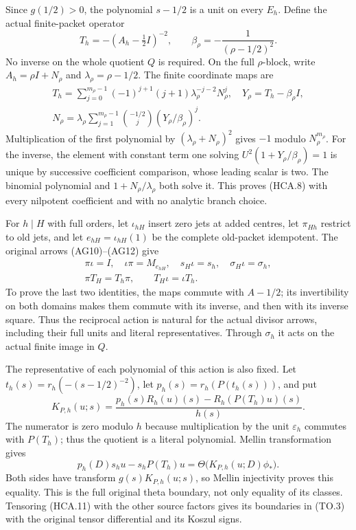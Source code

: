 Since $g(1/2)>0$, the polynomial $s-1/2$ is a unit on every
$E_h$. Define the actual finite-packet operator
\[
 T_h=-(A_h-\tfrac12I)^{-2},\qquad
 \beta_\rho=-\frac1{(\rho-1/2)^2}.
 \tag{HCA.7}
\]
No inverse on the whole quotient $Q$ is required. On the full
$\rho$-block, write $A_h=\rho I+N_\rho$ and
$\lambda_\rho=\rho-1/2$. The finite coordinate maps are
\[
 \begin{gathered}
 T_h=\sum_{j=0}^{m_\rho-1}(-1)^{j+1}(j+1)
                 \lambda_\rho^{-j-2}N_\rho^j,
 \quad Y_\rho=T_h-\beta_\rho I,\\
 N_\rho=\lambda_\rho\sum_{j=1}^{m_\rho-1}
             \binom{-1/2}{j}(Y_\rho/\beta_\rho)^j.
 \end{gathered}
 \tag{HCA.8}
\]
Multiplication of the first polynomial by
$(\lambda_\rho+N_\rho)^2$ gives $-1$ modulo $N_\rho^{m_\rho}$.
For the inverse, the element with constant term one solving
$U^2(1+Y_\rho/\beta_\rho)=1$ is unique by successive coefficient
comparison, whose leading scalar is two. The binomial polynomial
and $1+N_\rho/\lambda_\rho$ both solve it. This proves (HCA.8)
with every nilpotent coefficient and with no analytic branch choice.

For $h\mid H$ with full orders, let $\iota_{hH}$ insert zero
jets at added centres, let $\pi_{Hh}$ restrict to old jets, and
let $e_{hH}=\iota_{hH}(1)$ be the complete old-packet idempotent.
The original arrows (AG10)--(AG12) give
\[
 \begin{gathered}
 \pi\iota=I,\quad\iota\pi=M_{e_{hH}},\quad
 s_H\iota=s_h,\quad\sigma_H\iota=\sigma_h,\\
 \pi T_H=T_h\pi,\qquad T_H\iota=\iota T_h.
 \end{gathered}
 \tag{HCA.9}
\]
To prove the last two identities, the maps commute with $A-1/2$;
its invertibility on both domains makes them commute with its
inverse, and then with its inverse square. Thus the reciprocal
action is natural for the actual divisor arrows, including their
full units and literal representatives. Through $\sigma_h$ it
acts on the actual finite image in $Q$.

The representative of each polynomial of this action is also fixed.
Let $t_h(s)=r_h(-(s-1/2)^{-2})$, let
$p_h(s)=r_h(P(t_h(s)))$, and put
\[
 K_{P,h}(u;s)=
 \frac{p_h(s)R_h(u)(s)-R_h(P(T_h)u)(s)}{h(s)}.
 \tag{HCA.10}
\]
The numerator is zero modulo $h$ because multiplication by the
unit $\varepsilon_h$ commutes with $P(T_h)$; thus the quotient
is a literal polynomial. Mellin transformation gives
\[
 p_h(D)s_hu-s_hP(T_h)u
       =\Theta\bigl(K_{P,h}(u;D)\phi_*\bigr).
 \tag{HCA.11}
\]
Both sides have transform $g(s)K_{P,h}(u;s)$, so Mellin injectivity
proves this equality. This is the full original theta boundary,
not only equality of its classes. Tensoring (HCA.11) with the
other source factors gives its boundaries in (TO.3) with the
original tensor differential and its Koszul signs.


